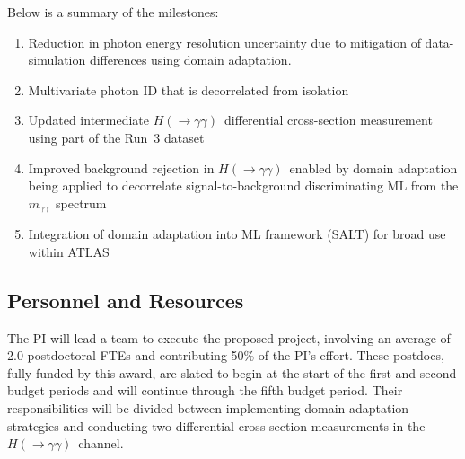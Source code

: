 \documentclass[letter, USenglish, 11pt, subfigure]{article}
\newcommand{\myy}{\ensuremath{m_{\gamma\gamma}}}
\newcommand{\hyy}{\ensuremath{H(\to\gamma\gamma)}}
\begin{document}
Below is a summary of the milestones:
\begin{enumerate}
\item Reduction in photon energy resolution uncertainty due to mitigation of data-simulation differences using domain adaptation.
\item Multivariate photon ID that is decorrelated from isolation
\item Updated intermediate \hyy\ differential cross-section measurement using part of the Run~3 dataset
\item Improved background rejection in \hyy\ enabled by domain adaptation being applied to decorrelate signal-to-background discriminating ML from the \myy\ spectrum
\item Integration of domain adaptation into ML framework (SALT) for broad use within ATLAS
\end{enumerate}

\subsection{Personnel and Resources}
\label{sec:personnel}
The PI will lead a team to execute the proposed project, involving an average of 2.0 postdoctoral FTEs and contributing 50\% of the PI's effort. These postdocs, fully funded by this award, are slated to begin at the start of the first and second budget periods and will continue through the fifth budget period. Their responsibilities will be divided between implementing domain adaptation strategies and conducting two differential cross-section measurements in the \hyy\ channel.
\end{document}
